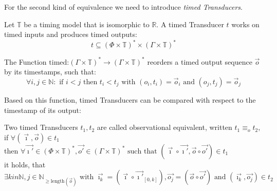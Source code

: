 For the second kind of equivalence we need to introduce \emph{timed Transducers}.

\begin{definition}[name = Timed Transducer]\label{def:timed_transducer}
  Let \(\mathbb{T}\) be a timing model that is isomorphic to \(\mathbb{R}\).
  A timed Transducer \(t\) works on timed inputs and produces timed outputs:
  \[t \subseteq {\left(\Phi \times \mathbb{T}\right)}^* \times {\left(\Gamma \times \mathbb{T}\right)}^*\]
\end{definition}

The Function \(\text{timed:} {(\Gamma \times \mathbb{T})}^* \rightarrow {(\Gamma \times \mathbb{T})}^* \)
reorders a timed output sequence \(\vec{o}\) by its timestamps, such that:
\[
  \forall i,j \in \mathbb{N}:\text{ if } i < j \text{ then } t_i < t_j \text{ with } (o_i, t_i) = \vec{o}_i \text{ and } (o_j, t_j) = \vec{o}_j
\]

Based on this function, timed Transducers can be compared with respect to the timestamp of its output:

\begin{definition}[name = Observational Equivalence]\label{def:observational_equivalence}
  Two timed Transducers \(t_1, t_2\) are called observational equivalent, written \(t_1 \equiv_o t_2\),\\
  if \(\forall (\vec{\imath},\vec{o}) \in t_1\) \\
then \( \forall \vec{\imath'} \in {(\Phi\times\mathbb{T})}^*, \vec{o'} \in {(\Gamma\times\mathbb{T})}^* \text{ such that } (\vec{\imath}\circ\vec{\imath'},\vec{o}\circ\vec{o'}) \in t_1\) \\
it holds, that \( \exists k in \mathbb{N},j \in \mathbb{N}_{\geq\text{length}(\vec{o})} \text{ with  } \vec{\imath_k} = (\vec{\imath}\circ\vec{\imath'}_{[0,k]}),
  \vec{o_j} = (\vec{o}\circ\vec{o'}) \text{ and } (\vec{\imath_k}, \vec{o_j}) \in t_2\)
\end{definition}



